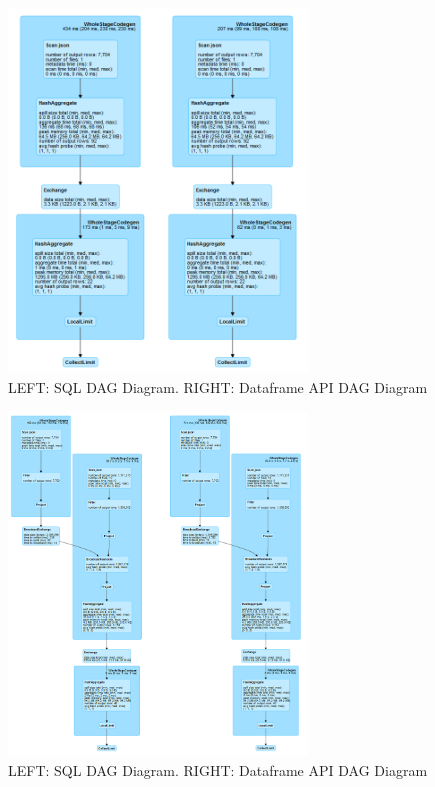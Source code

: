 \documentclass[]{article}
\begin{document}
\begin{figure}[h]

{\centering \includegraphics[width=300px]{images/query2} 

}

\caption{\label{fig:figs}LEFT: SQL DAG Diagram. RIGHT: Dataframe API DAG Diagram}\label{fig:unnamed-chunk-7}
\end{figure}

\begin{figure}[h]

{\centering \includegraphics[width=300px]{images/query3} 

}

\caption{\label{fig:figs}LEFT: SQL DAG Diagram. RIGHT: Dataframe API DAG Diagram}\label{fig:unnamed-chunk-8}
\end{figure}
\end{document}
